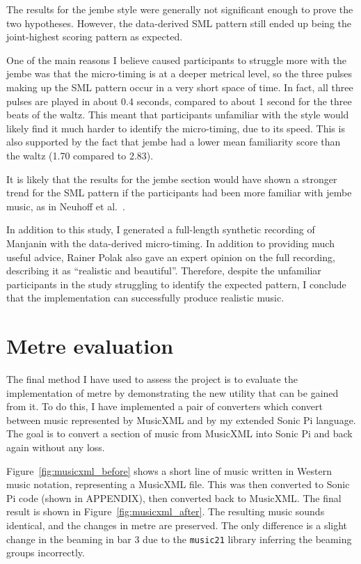 \documentclass[12pt,twoside,openright]{report}
\begin{document}
The results for the jembe style were generally not significant enough to prove
the two hypotheses. However, the data-derived SML pattern still ended up being
the joint-highest scoring pattern as expected.

One of the main reasons I believe caused participants to struggle more with the
jembe was that the micro-timing is at a deeper metrical level, so the three
pulses making up the SML pattern occur in a very short space of time. In fact, all three pulses are
played in about 0.4 seconds, compared to about 1 second for the three beats of
the waltz. This meant that participants unfamiliar with the style would likely
find it much harder to identify the micro-timing, due to its speed. This is also
supported by the fact that jembe had a lower mean familiarity score than the
waltz (1.70 compared to 2.83).

It is likely that the results for the jembe section would have shown a stronger
trend for the SML pattern if the participants had been more familiar with jembe
music, as in Neuhoff et al.\ \cite{neuhoff2017}.

In addition to this study, I generated a full-length synthetic recording of
Manjanin with the data-derived micro-timing. In addition to providing much
useful advice, Rainer Polak also gave an expert opinion on the full recording,
describing it as ``realistic and beautiful''. Therefore, despite the unfamiliar
participants in the study struggling to identify the expected pattern, I conclude that the implementation can successfully produce realistic music.



\section{Metre evaluation} \label{metre_evaluation}

The final method I have used to assess the project is to evaluate the
implementation of metre by demonstrating the new utility that can be gained from
it. To do this, I have implemented a pair of converters which convert between
music represented by MusicXML and by my extended Sonic Pi language. The goal is
to convert a section of music from MusicXML into Sonic Pi and back again without
any loss.

Figure~\ref{fig:musicxml_before} shows a short line of music written in Western music notation,
representing a MusicXML file. This was then converted to Sonic Pi code (shown in
APPENDIX), then converted back to MusicXML. The final result is
shown in Figure~\ref{fig:musicxml_after}. The resulting music sounds identical, and the changes in
metre are preserved. The only difference is a slight change in the beaming in
bar 3 due to the \verb'music21' library inferring the beaming groups incorrectly.
\end{document}
